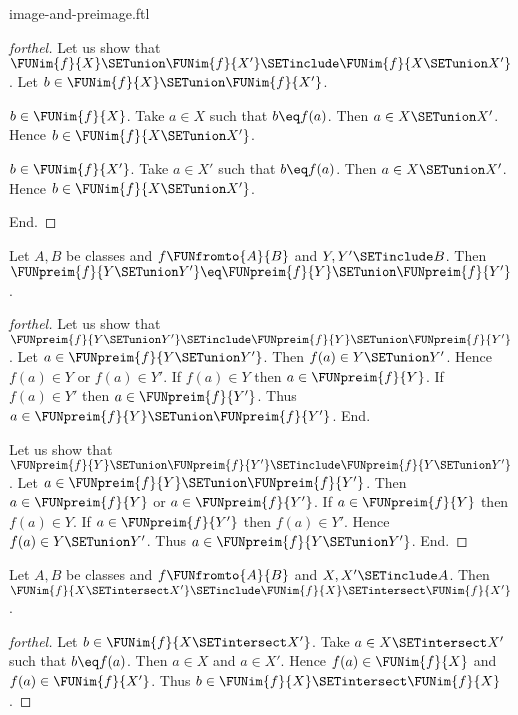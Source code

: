 \documentclass{naproche-library}
\begin{document}
\begin{smodule}[title=Computation Laws for Images and Preimages]{image-and-preimage.ftl}
\begin{proof}[forthel]
  Let us show that $\FUNim{f}{X} \SETunion \FUNim{f}{X'} \SETinclude \FUNim{f}{X \SETunion X'}$.
    Let $b \in \FUNim{f}{X} \SETunion \FUNim{f}{X'}$.

    \begin{case}{$b \in \FUNim{f}{X}$.}
      Take $a \in X$ such that $b \eq f(a)$.
      Then $a \in X \SETunion X'$.
      Hence $b \in \FUNim{f}{X \SETunion X'}$.
    \end{case}

    \begin{case}{$b \in \FUNim{f}{X'}$.}
      Take $a \in X'$ such that $b \eq f(a)$.
      Then $a \in X \SETunion X'$.
      Hence $b \in \FUNim{f}{X \SETunion X'}$.
    \end{case}
  End.
\end{proof}

\begin{proposition}[forthel,id=FOUNDATIONS_07_1547089051910144]
  Let $A, B$ be classes and $f \FUNfromto{A}{B}$ and $Y, Y' \SETinclude B$.
  Then $\FUNpreim{f}{Y \SETunion Y'} \eq \FUNpreim{f}{Y} \SETunion \FUNpreim{f}{Y'}$.
\end{proposition}
\begin{proof}[forthel]
  Let us show that $\FUNpreim{f}{Y \SETunion Y'} \SETinclude \FUNpreim{f}{Y} \SETunion \FUNpreim{f}{Y'}$.
    Let $a \in \FUNpreim{f}{Y \SETunion Y'}$.
    Then $f(a) \in Y \SETunion Y'$.
    Hence $f(a) \in Y$ or $f(a) \in Y'$.
    If $f(a) \in Y$ then $a \in \FUNpreim{f}{Y}$.
    If $f(a) \in Y'$ then $a \in \FUNpreim{f}{Y'}$.
    Thus $a \in \FUNpreim{f}{Y} \SETunion \FUNpreim{f}{Y'}$.
  End.

  Let us show that $\FUNpreim{f}{Y} \SETunion \FUNpreim{f}{Y'} \SETinclude \FUNpreim{f}{Y \SETunion Y'}$.
    Let $a \in \FUNpreim{f}{Y} \SETunion \FUNpreim{f}{Y'}$.
    Then $a \in \FUNpreim{f}{Y}$ or $a \in \FUNpreim{f}{Y'}$.
    If $a \in \FUNpreim{f}{Y}$ then $f(a) \in Y$.
    If $a \in \FUNpreim{f}{Y'}$ then $f(a) \in Y'$.
    Hence $f(a) \in Y \SETunion Y'$.
    Thus $a \in \FUNpreim{f}{Y \SETunion Y'}$.
  End.
\end{proof}

\begin{proposition}[forthel,id=FOUNDATIONS_07_3966130473402368]
  Let $A, B$ be classes and $f \FUNfromto{A}{B}$ and $X, X' \SETinclude A$.
  Then $\FUNim{f}{X \SETintersect X'} \SETinclude \FUNim{f}{X} \SETintersect \FUNim{f}{X'}$.
\end{proposition}
\begin{proof}[forthel]
  Let $b \in \FUNim{f}{X \SETintersect X'}$.
  Take $a \in X \SETintersect X'$ such that $b \eq f(a)$.
  Then $a \in X$ and $a \in X'$.
  Hence $f(a) \in \FUNim{f}{X}$ and $f(a) \in \FUNim{f}{X'}$.
  Thus $b \in \FUNim{f}{X} \SETintersect \FUNim{f}{X}$.
\end{proof}


\end{smodule}
\end{document}
